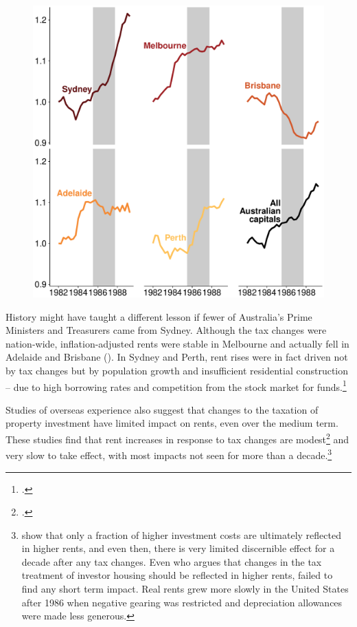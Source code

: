 \documentclass{grattanAlpha}\usepackage[]{graphicx}\usepackage[]{color}
\begin{document}
\begin{figure}
\includegraphics[width=\columnwidth]{CGT-NG-atlas/Capital_city_rents_direct_abs-1}
\end{figure}

History might have taught a different lesson if fewer of Australia’s Prime Ministers and Treasurers came from Sydney. Although the tax changes were nation-wide, inflation-adjusted rents were stable in Melbourne and actually fell in Adelaide and Brisbane (). In Sydney and Perth, rent rises were in fact driven not by tax changes but by population growth and insufficient residential construction – due to high borrowing rates and competition from the stock market for funds.\footcites[][186]{BadcockBrowett1991}[][47--48]{DaleyMcGannonSavage2013}

Studies of overseas experience also suggest that changes to the taxation of property investment have limited impact on rents, even over the medium term. These studies find that rent increases in response to tax changes are modest\footcite{DiPasqualeWheaton1992}  and very slow to take effect, with most impacts not seen for more than a decade.\footnote{\textcite{BlackleyFollain1996}\label{footnote:BlackleyFollain} show that only a fraction of higher investment costs are ultimately reflected in higher rents, and even then, there is very limited discernible effect for a decade after any tax changes. Even \textcite{Poterba1992} who argues that changes in the tax treatment of investor housing should be reflected in higher rents, failed to find any short term impact. Real rents grew more slowly in the United States after 1986 when negative gearing was restricted and depreciation allowances were made less generous.}\label{endnote:BlackleyFollain}
\end{document}
